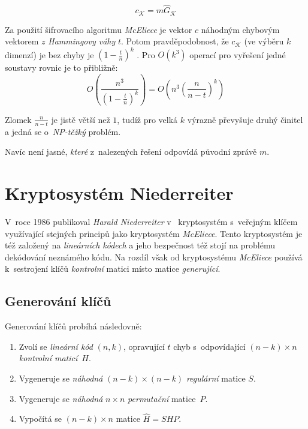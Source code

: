 \documentclass[thesis=M,czech,hidelinks]{FITthesis}[2012/06/26]
\newcommand{\0}{{\textcolor[gray]{0.80}{0}}}
\begin{document}
$$c_{\mathcal{K}} = m \hat{G}_{\mathcal{K}}$$

Za použití šifrovacího algoritmu \emph{McEliece} je vektor $c$ 
náhodným chybovým vektorem $z$ \emph{Hammingovy váhy} $t$. Potom
pravděpodobnost, že $c_{\mathcal{K}}$ (ve výběru $k$ dimenzí) je bez chyby je
$\left(1-\frac{t}{n}\right)^k$ \cite{McEliece}. Pro $O\left(k^3\right)$ operací
pro vyřešení jedné soustavy rovnic je to přibližně:
$$ O\left( \frac{n^3}{\left(1-\frac{t}{n}\right)^k} \right) =
O\left( n^3 \left(\frac{n}{n-t}\right)^k \right)$$

Zlomek $\frac{n}{n-t}$ je jistě větší než $1$, tudíž pro velká $k$ výrazně
převyšuje druhý činitel a jedná se o~\emph{NP-těžký} problém.

Navíc není jasné, \emph{které} z~nalezených řešení odpovídá původní zprávě $m$.

\section{Kryptosystém Niederreiter}
V~roce 1986 publikoval \emph{Harald Niederreiter} v~\cite{Niederreiter}
kryptosystém s~veřejným klíčem využívající stejných principů jako kryptosystém
\emph{McEliece}. Tento kryptosystém je též založený na \emph{lineárních kódech}
a jeho bezpečnost též stojí na problému dekódování neznámého kódu. Na rozdíl
však od kryptosystému \emph{McEliece} používá k~sestrojení klíčů
\emph{kontrolní} matici místo matice \emph{generující}.

\subsection{Generování klíčů}
Generování klíčů probíhá následovně:
\begin{enumerate}
    \item Zvolí se \emph{lineární kód} $(n,k)$, opravující $t$ chyb
        s~odpovídající $(n-k) \times n$ \emph{kontrolní maticí}~$H$.
    \item Vygeneruje se \emph{náhodná} $(n-k) \times (n-k)$ \emph{regulární}
        matice $S$.
    \item Vygeneruje se \emph{náhodná} $n \times n$ \emph{permutační}
        matice~$P$.
    \item Vypočítá se $(n-k) \times n$ matice $\hat{H} = S H P$.
\end{enumerate}
\end{document}

